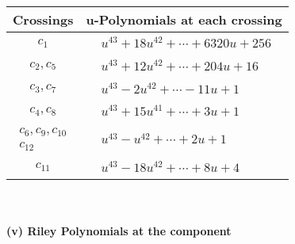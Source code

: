 \documentclass[1p]{elsarticle_modified}
\theoremstyle{definition}
\begin{document}
\begin{tabular}{m{50pt}|m{274pt}}
Crossings & \hspace{64pt}u-Polynomials at each crossing \\
\hline $$\begin{aligned}c_{1}\end{aligned}$$&$\begin{aligned}
&u^{43}+18 u^{42}+\cdots+6320 u+256
\end{aligned}$\\
\hline $$\begin{aligned}c_{2},c_{5}\end{aligned}$$&$\begin{aligned}
&u^{43}+12 u^{42}+\cdots+204 u+16
\end{aligned}$\\
\hline $$\begin{aligned}c_{3},c_{7}\end{aligned}$$&$\begin{aligned}
&u^{43}-2 u^{42}+\cdots-11 u+1
\end{aligned}$\\
\hline $$\begin{aligned}c_{4},c_{8}\end{aligned}$$&$\begin{aligned}
&u^{43}+15 u^{41}+\cdots+3 u+1
\end{aligned}$\\
\hline $$\begin{aligned}c_{6},c_{9},c_{10}\\c_{12}\end{aligned}$$&$\begin{aligned}
&u^{43}- u^{42}+\cdots+2 u+1
\end{aligned}$\\
\hline $$\begin{aligned}c_{11}\end{aligned}$$&$\begin{aligned}
&u^{43}-18 u^{42}+\cdots+8 u+4
\end{aligned}$\\
\hline
\end{tabular}\\~\\
\newpage\renewcommand{\arraystretch}{1}
\flushleft \textbf{(v) Riley Polynomials at the component}\newline \\
\end{document}
